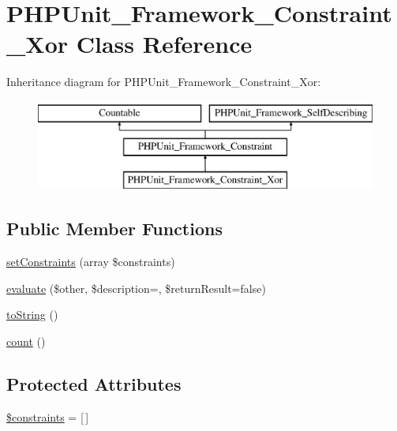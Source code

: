 \hypertarget{class_p_h_p_unit___framework___constraint___xor}{}\section{P\+H\+P\+Unit\+\_\+\+Framework\+\_\+\+Constraint\+\_\+\+Xor Class Reference}
\label{class_p_h_p_unit___framework___constraint___xor}
Inheritance diagram for P\+H\+P\+Unit\+\_\+\+Framework\+\_\+\+Constraint\+\_\+\+Xor\+:\begin{figure}[H]
\begin{center}
\leavevmode
\includegraphics[height=3.000000cm]{class_p_h_p_unit___framework___constraint___xor}
\end{center}
\end{figure}
\subsection*{Public Member Functions}
\begin{DoxyCompactItemize}
\item 
\mbox{\hyperlink{class_p_h_p_unit___framework___constraint___xor_aecb273becbedcf46aedb2d32075ae564}{set\+Constraints}} (array \$constraints)
\item 
\mbox{\hyperlink{class_p_h_p_unit___framework___constraint___xor_a4c184790087f7d42c3daf0d0180fe5fb}{evaluate}} (\$other, \$description=\textquotesingle{}\textquotesingle{}, \$return\+Result=false)
\item 
\mbox{\hyperlink{class_p_h_p_unit___framework___constraint___xor_a5558c5d549f41597377fa1ea8a1cefa3}{to\+String}} ()
\item 
\mbox{\hyperlink{class_p_h_p_unit___framework___constraint___xor_ac751e87b3d4c4bf2feb03bee8b092755}{count}} ()
\end{DoxyCompactItemize}
\subsection*{Protected Attributes}
\begin{DoxyCompactItemize}
\item 
\mbox{\hyperlink{class_p_h_p_unit___framework___constraint___xor_a9f4fd8838aaef9b57d3fac0dbf9a7929}{\$constraints}} = \mbox{[}$\,$\mbox{]}
\end{DoxyCompactItemize}
